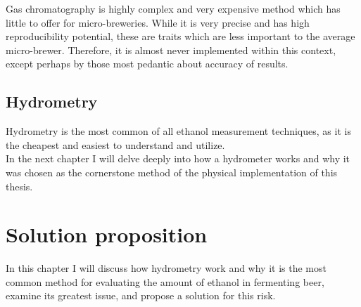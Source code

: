 \documentclass[twoside]{ctuthesis}
\theoremstyle{plain}
\theoremstyle{definition}
\theoremstyle{note}
\begin{document}
Gas chromatography is highly complex and very expensive method which has little to offer for micro-breweries. While it is very precise and has high reproducibility potential, these are traits which are less important to the average micro-brewer. Therefore, it is almost never implemented within this context, except perhaps by those most pedantic about accuracy of results.

\newpage

\section{Hydrometry}
Hydrometry is the most common of all ethanol measurement techniques, as it is the cheapest and easiest to understand and utilize.\\
In the next chapter I will delve deeply into how a hydrometer works and why it was chosen as the cornerstone method of the physical implementation of this thesis.

\pagebreak

\begingroup
\renewcommand{\cleardoublepage}{}
\renewcommand{\clearpage}{}
\chapter{Solution proposition}
\endgroup

In this chapter I will discuss how hydrometry work and why it is the most common method for evaluating the amount of ethanol in fermenting beer, examine its greatest issue, and propose a solution for this risk.
\end{document}

